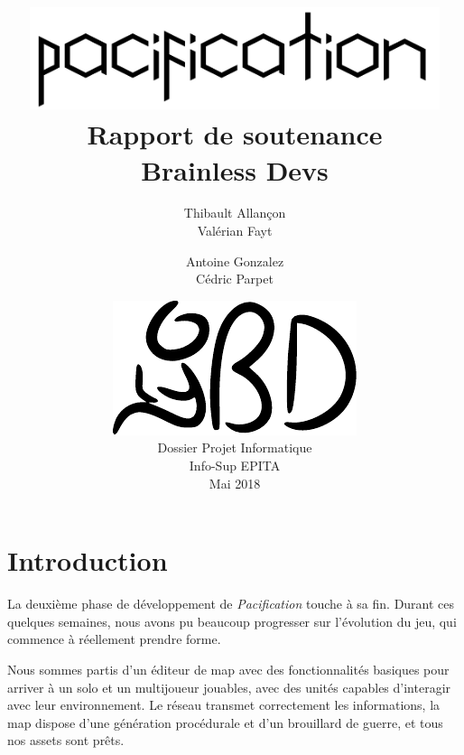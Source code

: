 \documentclass[12pt]{report}
\begin{document}
\title{
	{\vspace{3em}\protect\centering\protect\includegraphics[width=0.9\textwidth]{Pacification_logo}}\\
	{\vspace{4em}\Huge Rapport de soutenance}\\
	{\large Brainless Devs}
}
\author{
	Thibault Allançon\\
	Valérian Fayt
	\and
	Antoine Gonzalez\\
	Cédric Parpet}
\date{
	{\vfill\protect\centering\protect\includegraphics{brainless_devs.pdf}}\\
	Dossier Projet Informatique\\
	Info-Sup EPITA\\
	Mai 2018
}

\maketitle
\tableofcontents

\chapter{Introduction}

La deuxième phase de développement de \textit{Pacification} touche à sa fin.
Durant ces quelques semaines, nous avons pu beaucoup progresser sur l’évolution
du jeu, qui commence à réellement prendre forme. 

Nous sommes partis d’un éditeur de map avec des fonctionnalités basiques pour
arriver à un solo et un multijoueur jouables, avec des unités capables
d'interagir avec leur environnement. Le réseau transmet correctement les
informations, la map dispose d’une génération procédurale et d’un brouillard de
guerre, et tous nos assets sont prêts.
\end{document}
